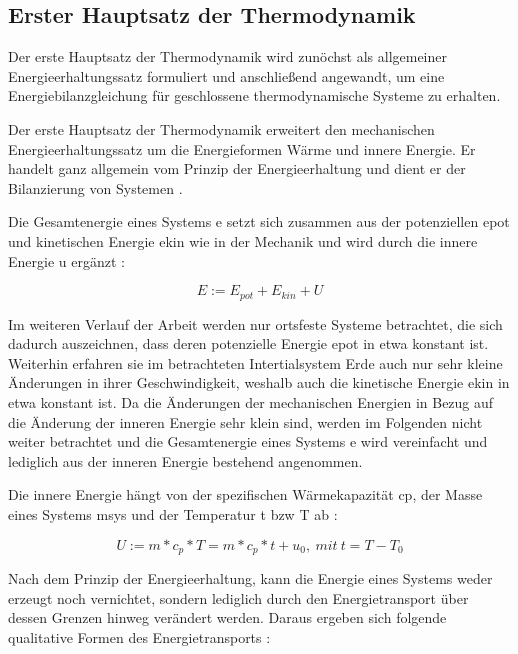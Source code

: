 \subsection{Erster Hauptsatz der Thermodynamik}

Der erste Hauptsatz der Thermodynamik wird zunöchst als allgemeiner Energieerhaltungssatz formuliert und anschließend angewandt, um eine Energiebilanzgleichung für geschlossene thermodynamische Systeme zu erhalten.

Der erste Hauptsatz der Thermodynamik erweitert den mechanischen Energieerhaltungssatz um die Energieformen Wärme und innere Energie. Er handelt ganz allgemein vom Prinzip der Energieerhaltung und  dient er der Bilanzierung von Systemen \cite[S.~43]{ba12}.

Die Gesamtenergie eines Systems \gls{e} setzt sich zusammen aus der potenziellen \gls{epot} und kinetischen Energie \gls{ekin} wie in der Mechanik und wird durch die innere Energie \gls{u} ergänzt \cite[S.~49]{ba12}:

\begin{equation}
\label{eq:energie}
E := E_{pot} + E_{kin} + U
\end{equation}

Im weiteren Verlauf der Arbeit werden nur ortsfeste Systeme betrachtet, die sich dadurch auszeichnen, dass deren potenzielle Energie  \gls{epot} in etwa konstant ist. Weiterhin erfahren sie im betrachteten Intertialsystem Erde auch nur sehr kleine Änderungen in ihrer Geschwindigkeit, weshalb auch die kinetische Energie \gls{ekin} in etwa konstant ist.  Da die Änderungen der mechanischen Energien in Bezug auf die Änderung der inneren Energie sehr klein sind, werden im Folgenden nicht weiter betrachtet und die Gesamtenergie eines Systems \gls{e} wird vereinfacht und lediglich aus der inneren Energie bestehend angenommen.

Die innere Energie hängt von der spezifischen Wärmekapazität \gls{cp}, der Masse eines Systems \gls{msys} und der Temperatur \gls{t} \acrlong{bzw} \gls{T} ab \cite[S.~54]{ba12}:

\begin{equation}
\label{eq:innereenergie}
U := m*c_p*T=m*c_p*t+u_0,~mit~t=T-T_0
\end{equation}

Nach dem Prinzip der Energieerhaltung, kann die Energie eines Systems weder erzeugt noch vernichtet, sondern lediglich durch den Energietransport über dessen Grenzen hinweg verändert werden. Daraus ergeben sich folgende qualitative Formen des Energietransports \cite[S.~48f.]{ba12}:

